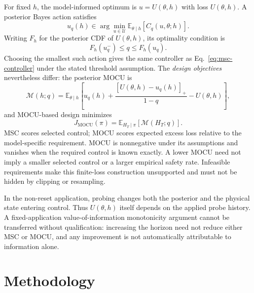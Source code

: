 \documentclass[journal]{IEEEtran}
\newcommand{\E}{\mathbb{E}}
\begin{document}
For fixed $h$, the model-informed optimum is $u=U(\theta,h)$ with loss
$U(\theta,h)$. A posterior Bayes action satisfies
\begin{equation}
u_q(h)\in\arg\min_{u\in\mathcal U}
\E_{\theta\mid h}[C_q(u,\theta;h)].
\label{eq:bayes-action}
\end{equation}
Writing $F_h$ for the posterior CDF of $U(\theta,h)$, its optimality condition is
\begin{equation}
F_h(u_q^-)\le q\le F_h(u_q).
\label{eq:quantile_optimality}
\end{equation}
Choosing the smallest such action gives the same controller as
Eq.~\eqref{eq:msc-controller} under the stated threshold assumption. The
\emph{design objectives} nevertheless differ: the posterior MOCU is
\begin{equation}
\mathcal M(h;q)=\E_{\theta\mid h}
\left[u_q(h)+\frac{[U(\theta,h)-u_q(h)]_+}{1-q}-U(\theta,h)\right],
\label{eq:mocu}
\end{equation}
and MOCU-based design minimizes
\begin{equation}
J_{\mathrm{MOCU}}(\pi)=\E_{H_T\mid\pi}[\mathcal M(H_T;q)].
\label{eq:mocu-objective}
\end{equation}
MSC scores selected control; MOCU scores expected excess loss relative to
the model-specific requirement. MOCU is nonnegative under its assumptions
and vanishes when the required control is known exactly. A lower MOCU need
not imply a smaller selected control or a larger empirical safety rate.
Infeasible requirements make this finite-loss construction unsupported and
must not be hidden by clipping or resampling.

In the non-reset application, probing changes both the posterior and the
physical state entering control. Thus $U(\theta,h)$ itself depends on the
applied probe history. A fixed-application value-of-information monotonicity
argument cannot be transferred without qualification: increasing the horizon
need not reduce either MSC or MOCU, and any improvement is not automatically
attributable to information alone.

\section{Methodology}
\label{sec:methodology}
\end{document}
